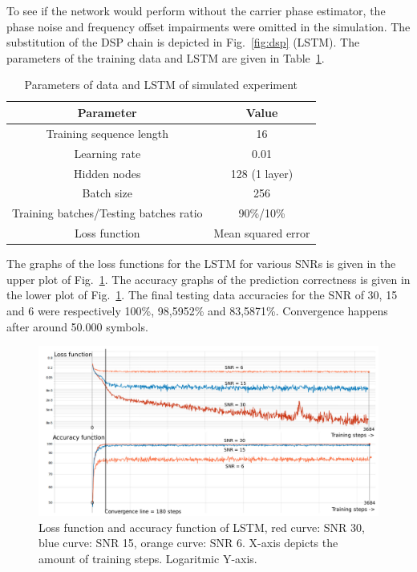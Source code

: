 \documentclass[journal,10pt,twoside, a4paper]{IEEEtran}
\begin{document}
To see if the network would perform without the carrier phase estimator, the phase noise and frequency offset impairments were omitted in the simulation. The substitution of the DSP chain is depicted in Fig.~\ref{fig:dsp} (LSTM). The parameters of the training data and LSTM are given in Table~\ref{tab:lstm}. 

\begin{table}
    \centering
    \caption{Parameters of data and LSTM of simulated experiment}
    \label{tab:lstm}
    \begin{tabular}{c|c}
        Parameter & Value\\
        \hline
        Training sequence length & 16\\
        Learning rate & 0.01\\
        Hidden nodes & 128 (1 layer)\\
        Batch size & 256\\
        Training batches/Testing batches ratio & 90\%/10\%\\
        Loss function & Mean squared error\\
    \end{tabular}
\end{table}

The graphs of the loss functions for the LSTM for various SNRs is given in the upper plot of Fig.~\ref{fig:loss}. The accuracy graphs of the prediction correctness is given in the lower plot of Fig.~\ref{fig:loss}. The final testing data accuracies for the SNR of 30, 15 and 6 were respectively 100\%, 98,5952\% and 83,5871\%. Convergence happens after around 50.000 symbols.

\begin{figure}
    \centering
    \includegraphics[width=\linewidth]{Thesis/images/loss.pdf}
    \caption{Loss function and accuracy function of LSTM, red curve: SNR 30, blue curve: SNR 15, orange curve: SNR 6. X-axis depicts the amount of training steps. Logaritmic Y-axis.}
    \label{fig:loss}
\end{figure}
\end{document}
